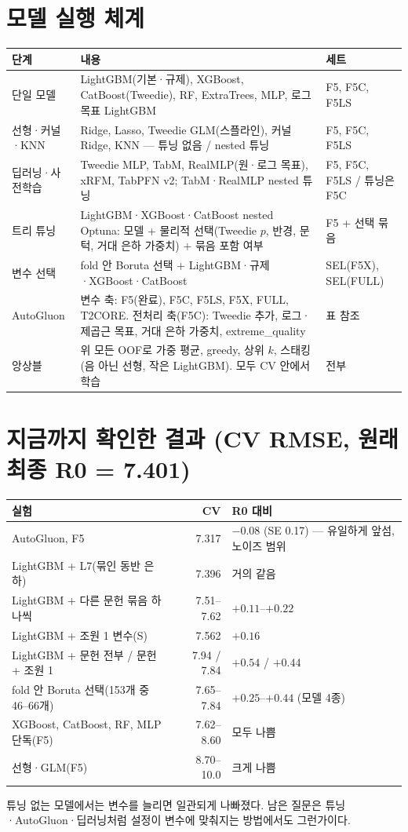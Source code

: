 \documentclass[10pt,a4paper]{article}
\begin{document}
\section{모델 실행 체계}
\begin{tabularx}{\linewidth}{@{}l Y l@{}}
\toprule
단계 & 내용 & 세트\\
\midrule
단일 모델 & LightGBM(기본·규제), XGBoost, CatBoost(Tweedie), RF, ExtraTrees, MLP, 로그 목표 LightGBM & F5, F5C, F5LS\\
선형·커널·KNN & Ridge, Lasso, Tweedie GLM(스플라인), 커널 Ridge, KNN — 튜닝 없음 / nested 튜닝 & F5, F5C, F5LS\\
딥러닝·사전학습 & Tweedie MLP, TabM, RealMLP(원·로그 목표), xRFM, TabPFN v2; TabM·RealMLP nested 튜닝 & F5, F5C, F5LS / 튜닝은 F5C\\
트리 튜닝 & LightGBM·XGBoost·CatBoost nested Optuna: 모델 + 물리적 선택(Tweedie $p$, 반경, 문턱, 거대 은하 가중치) + 묶음 포함 여부 & F5 + 선택 묶음\\
변수 선택 & fold 안 Boruta 선택 + LightGBM·규제·XGBoost·CatBoost & SEL(F5X), SEL(FULL)\\
AutoGluon & 변수 축: F5(완료), F5C, F5LS, F5X, FULL, T2CORE. 전처리 축(F5C): Tweedie 추가, 로그·제곱근 목표, 거대 은하 가중치, extreme\_quality & 표 참조\\
앙상블 & 위 모든 OOF로 가중 평균, greedy, 상위 $k$, 스태킹(음 아닌 선형, 작은 LightGBM). 모두 CV 안에서 학습 & 전부\\
\bottomrule
\end{tabularx}

\section{지금까지 확인한 결과 (CV RMSE, 원래 최종 R0 = 7.401)}
\begin{tabularx}{\linewidth}{@{}l r Y@{}}
\toprule
실험 & CV & R0 대비\\
\midrule
AutoGluon, F5 & 7.317 & $-0.08$ (SE 0.17) — 유일하게 앞섬, 노이즈 범위\\
LightGBM + L7(묶인 동반 은하) & 7.396 & 거의 같음\\
LightGBM + 다른 문헌 묶음 하나씩 & 7.51–7.62 & $+0.11$–$+0.22$\\
LightGBM + 조원 1 변수(S) & 7.562 & $+0.16$\\
LightGBM + 문헌 전부 / 문헌 + 조원 1 & 7.94 / 7.84 & $+0.54$ / $+0.44$\\
fold 안 Boruta 선택(153개 중 46–66개) & 7.65–7.84 & $+0.25$–$+0.44$ (모델 4종)\\
XGBoost, CatBoost, RF, MLP 단독(F5) & 7.62–8.60 & 모두 나쁨\\
선형·GLM(F5) & 8.70–10.0 & 크게 나쁨\\
\bottomrule
\end{tabularx}
튜닝 없는 모델에서는 변수를 늘리면 일관되게 나빠졌다. 남은 질문은 튜닝·AutoGluon·딥러닝처럼 설정이 변수에 맞춰지는 방법에서도 그런가이다.
\end{document}
